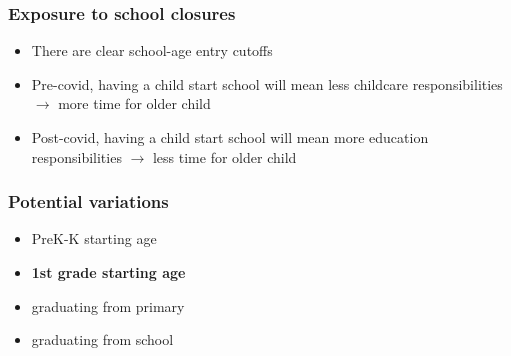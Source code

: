 \documentclass{beamer}
\begin{document}
\begin{frame}
    \label{update_scott}
    \frametitle{Exposure to school closures}
    \begin{itemize}
        \item There are clear school-age entry cutoffs
        \item Pre-covid, having a child start school will mean less childcare responsibilities $\rightarrow$ more time for older child
        \item Post-covid, having a child start school will mean more education responsibilities $\rightarrow$ less time for older child
    \end{itemize}
\end{frame}

\begin{frame}
    \label{update_scott}
    \frametitle{Potential variations}
    \begin{itemize}
        \item PreK-K starting age
        \item \textbf{1st grade starting age}
        \item graduating from primary
        \item graduating from school
    \end{itemize}
\end{frame}
\end{document}
